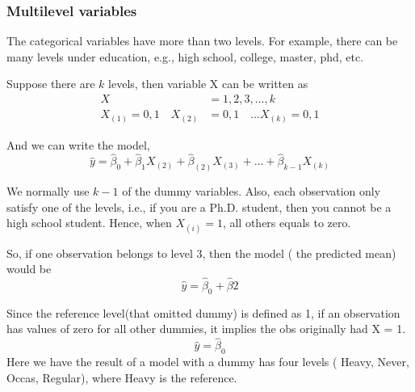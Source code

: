 \documentclass[12pt]{article}
\begin{document}
\subsubsection{Multilevel variables}
The categorical variables have more than two levels.
For example, there can be many levels under education, e.g., 
high school, college, master, phd, etc.

Suppose there are $ k $ levels, then variable X can be written as
\begin{align*}
X &= 1,2,3,...,k\\
X_{(1)} = 0,1 \quad X_{(2)} &= 0,1 \quad ... X_{(k)} = 0,1
\end{align*}

And we can write the model,
\begin{equation*}
 \widehat{y} =  \widehat{\beta}_{0} +  \widehat{\beta}_{1}X_{(2)}
  +  \widehat{\beta}_{(2)}X_{(3)} + ... +  \widehat{\beta}_{k - 1}X_{(k)}
\end{equation*}

We normally use $ k - 1 $ of the dummy variables. Also,
each observation only satisfy one of the levels, i.e., if you are a
Ph.D. student, then you cannot be a high school student.
Hence, when $ X_{(i)} = 1 $, all others equals to zero.

So, if one observation belongs to level 3, then the model (
the predicted mean) would be
\begin{equation*}
 \widehat{y} =  \widehat{\beta}_{0} +  \widehat{\beta}2
\end{equation*}

Since the reference level(that omitted dummy) is defined as 1, 
if an observation has values of zero for all other dummies, it
implies the obs originally had X = 1.
\begin{equation*}
 \widehat{y} =   \widehat{\beta}_{0}
\end{equation*}
Here we have the result of a model with a dummy has four levels (
Heavy, Never, Occas, Regular), where Heavy is the reference.

\begin{figure}[H]
\end{figure}
\end{document}
